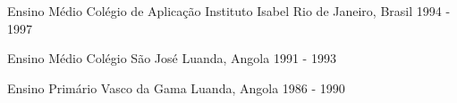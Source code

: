 \begin{cventries}

\cventry
{Ensino Médio} %
{Colégio de Aplicação Instituto Isabel} %
{Rio de Janeiro, Brasil} %
{1994 - 1997} %
{ %
}


\cventry
{Ensino Médio} %
{Colégio São José} %
{Luanda, Angola} %
{1991 - 1993} %
{ %
}


\cventry
{Ensino Primário} %
{Vasco da Gama} %
{Luanda, Angola} %
{1986 - 1990} %
{ %
}


\end{cventries}
